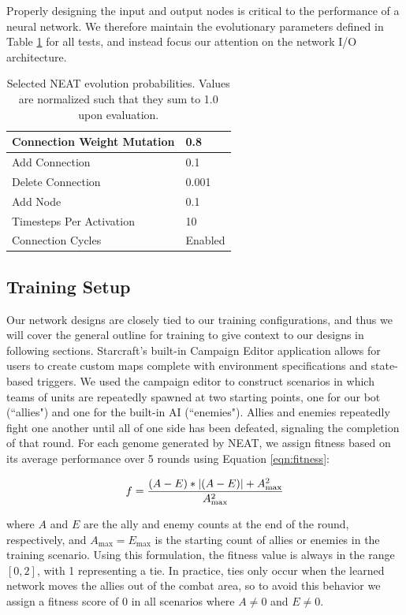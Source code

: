 \documentclass[10pt,a4paper,twocolumn]{article}
\begin{document}
Properly designing the input and output nodes is critical to the performance of a neural network. We therefore maintain the evolutionary parameters defined in Table \ref{tab:neat_params_specific} for all tests, and instead focus our attention on the network I/O architecture.

\begin{table}
\centering
\begin{tabular}{|l|l|}
	\hline
	Connection Weight Mutation & 0.8\\ \hline
	Add Connection & 0.1\\ \hline
	Delete Connection & 0.001\\ \hline
	Add Node & 0.1\\ \hline
	Timesteps Per Activation & 10\\ \hline
	Connection Cycles & Enabled \\ \hline
\end{tabular}
\caption{Selected NEAT evolution probabilities. Values are normalized such that they sum to 1.0 upon evaluation.}
\label{tab:neat_params_specific}
\end{table}

\subsection{Training Setup}

Our network designs are closely tied to our training configurations, and thus we will cover the general outline for training to give context to our designs in following sections. Starcraft's built-in Campaign Editor application allows for users to create custom maps complete with environment specifications and state-based triggers. We used the campaign editor to construct scenarios in which teams of units are repeatedly spawned at two starting points, one for our bot (``allies") and one for the built-in AI (``enemies"). Allies and enemies repeatedly fight one another until all of one side has been defeated, signaling the completion of that round. For each genome generated by NEAT, we assign fitness based on its average performance over 5 rounds using Equation \ref{eqn:fitness}:

\begin{equation}
f = \frac{(A - E) * |(A - E)| + A_\mathrm{max}^2}{A_\mathrm{max}^2}\\
\label{eqn:fitness}
\end{equation}

where $A$ and $E$ are the ally and enemy counts at the end of the round, respectively, and $A_\mathrm{max} = E_\mathrm{max}$ is the starting count of allies or enemies in the training scenario. Using this formulation, the fitness value is always in the range $[0,2]$, with 1 representing a tie. In practice, ties only occur when the learned network moves the allies out of the combat area, so to avoid this behavior we assign a fitness score of 0 in all scenarios where $A \neq 0$ and $E \neq 0$.
\end{document}
